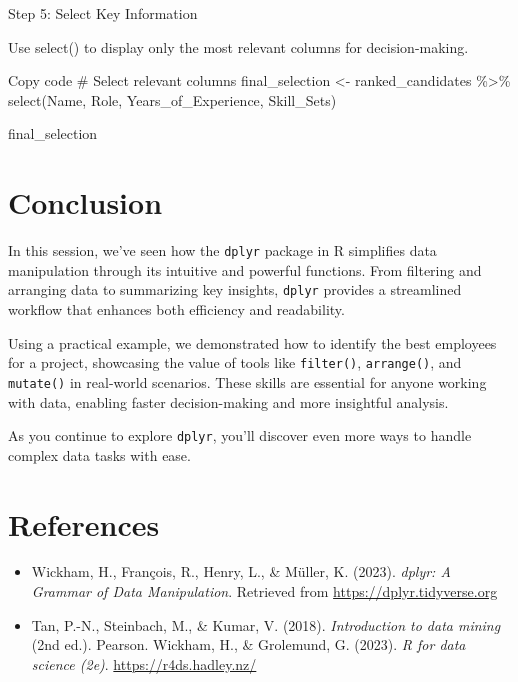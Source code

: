 \documentclass[
  11pt,
  a4paper]{article}
\newenvironment{Shaded}{\begin{snugshade}}{\end{snugshade}}
\newcommand{\CommentTok}[1]{\textcolor[rgb]{0.37,0.37,0.37}{#1}}
\newcommand{\FunctionTok}[1]{\textcolor[rgb]{0.28,0.35,0.67}{#1}}
\newcommand{\NormalTok}[1]{\textcolor[rgb]{0.00,0.23,0.31}{#1}}
\newcommand{\OtherTok}[1]{\textcolor[rgb]{0.00,0.23,0.31}{#1}}
\newcommand{\SpecialCharTok}[1]{\textcolor[rgb]{0.37,0.37,0.37}{#1}}
\begin{document}
Step 5: Select Key Information

Use select() to display only the most relevant columns for
decision-making.

\begin{Shaded}
\begin{Highlighting}[]
\NormalTok{Copy code}
\CommentTok{\# Select relevant columns}
\NormalTok{final\_selection }\OtherTok{\textless{}{-}}\NormalTok{ ranked\_candidates }\SpecialCharTok{\%\textgreater{}\%}
  \FunctionTok{select}\NormalTok{(Name, Role, Years\_of\_Experience, Skill\_Sets)}

\NormalTok{final\_selection}
\end{Highlighting}
\end{Shaded}

\section{Conclusion}\label{conclusion}

In this session, we've seen how the \texttt{dplyr} package in R
simplifies data manipulation through its intuitive and powerful
functions. From filtering and arranging data to summarizing key
insights, \texttt{dplyr} provides a streamlined workflow that enhances
both efficiency and readability.

Using a practical example, we demonstrated how to identify the best
employees for a project, showcasing the value of tools like
\texttt{filter()}, \texttt{arrange()}, and \texttt{mutate()} in
real-world scenarios. These skills are essential for anyone working with
data, enabling faster decision-making and more insightful analysis.

As you continue to explore \texttt{dplyr}, you'll discover even more
ways to handle complex data tasks with ease.

\section{References}\label{references}

\begin{itemize}
\item
  Wickham, H., François, R., Henry, L., \& Müller, K. (2023).
  \emph{dplyr: A Grammar of Data Manipulation}. Retrieved from
  \href{https://dplyr.tidyverse.org/}{https://dplyr.tidyverse.org}
\item
  Tan, P.-N., Steinbach, M., \& Kumar, V. (2018). \emph{Introduction to
  data mining} (2nd ed.). Pearson. Wickham, H., \& Grolemund, G. (2023).
  \emph{R for data science (2e)}. \url{https://r4ds.hadley.nz/}
\end{itemize}
\end{document}
